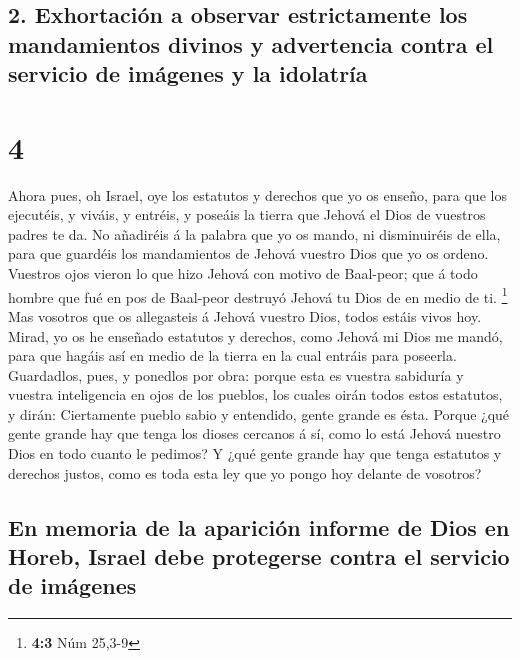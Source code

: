 \hypertarget{exhortaciuxf3n-a-observar-estrictamente-los-mandamientos-divinos-y-advertencia-contra-el-servicio-de-imuxe1genes-y-la-idolatruxeda}{%
\subsection{2. Exhortación a observar estrictamente los mandamientos
divinos y advertencia contra el servicio de imágenes y la
idolatría}\label{exhortaciuxf3n-a-observar-estrictamente-los-mandamientos-divinos-y-advertencia-contra-el-servicio-de-imuxe1genes-y-la-idolatruxeda}}

\hypertarget{section-3}{%
\section{4}\label{section-3}}

 Ahora pues, oh Israel, oye los estatutos y derechos que
yo os enseño, para que los ejecutéis, y viváis, y entréis, y poseáis la
tierra que Jehová el Dios de vuestros padres te da.  No
añadiréis á la palabra que yo os mando, ni disminuiréis de ella, para
que guardéis los mandamientos de Jehová vuestro Dios que yo os ordeno.
 Vuestros ojos vieron lo que hizo Jehová con motivo de
Baal-peor; que á todo hombre que fué en pos de Baal-peor destruyó Jehová
tu Dios de en medio de ti. \footnote{\textbf{4:3} Núm 25,3-9}
 Mas vosotros que os allegasteis á Jehová vuestro Dios,
todos estáis vivos hoy.  Mirad, yo os he enseñado
estatutos y derechos, como Jehová mi Dios me mandó, para que hagáis así
en medio de la tierra en la cual entráis para poseerla. 
Guardadlos, pues, y ponedlos por obra: porque esta es vuestra sabiduría
y vuestra inteligencia en ojos de los pueblos, los cuales oirán todos
estos estatutos, y dirán: Ciertamente pueblo sabio y entendido, gente
grande es ésta.  Porque ¿qué gente grande hay que tenga
los dioses cercanos á sí, como lo está Jehová nuestro Dios en todo
cuanto le pedimos?  Y ¿qué gente grande hay que tenga
estatutos y derechos justos, como es toda esta ley que yo pongo hoy
delante de vosotros?

\hypertarget{en-memoria-de-la-apariciuxf3n-informe-de-dios-en-horeb-israel-debe-protegerse-contra-el-servicio-de-imuxe1genes}{%
\subsection{En memoria de la aparición informe de Dios en Horeb, Israel
debe protegerse contra el servicio de
imágenes}\label{en-memoria-de-la-apariciuxf3n-informe-de-dios-en-horeb-israel-debe-protegerse-contra-el-servicio-de-imuxe1genes}}

